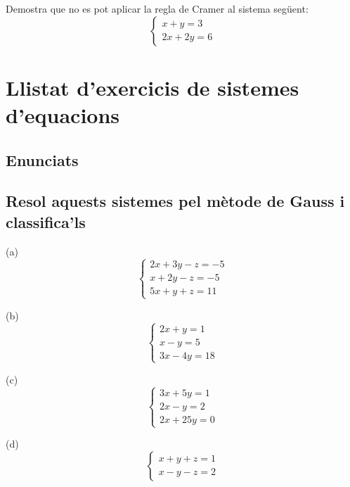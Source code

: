 \documentclass[12pt]{article}
\begin{document}
\begin{exercici}
Demostra que no es pot aplicar la regla de Cramer al sistema següent:
\[
\begin{cases}
x + y = 3 \\
2x + 2y = 6
\end{cases}
\]
\end{exercici}

\newpage


\newpage

\section{Llistat d'exercicis de sistemes d'equacions}

\subsection{Enunciats}

\subsection*{Resol aquests sistemes pel mètode de Gauss i classifica'ls}

\begin{exercici}
(a) 
\[
\begin{cases}
2x + 3y - z = -5 \\
x + 2y - z = -5 \\
5x + y + z = 11
\end{cases}
\]
\end{exercici}

\begin{exercici}
(b) 
\[
\begin{cases}
2x + y = 1 \\
x - y = 5 \\
3x - 4y = 18
\end{cases}
\]
\end{exercici}

\begin{exercici}
(c) 
\[
\begin{cases}
3x + 5y = 1 \\
2x - y = 2 \\
2x + 25y = 0
\end{cases}
\]
\end{exercici}

\begin{exercici}
(d) 
\[
\begin{cases}
x + y + z = 1 \\
x - y - z = 2
\end{cases}
\]
\end{exercici}
\end{document}
